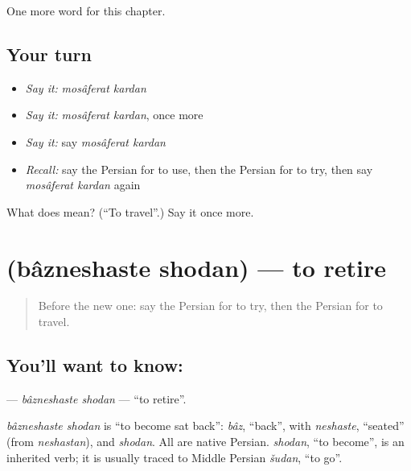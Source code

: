 \begin{grammarlens}[title={What you've built}]
One more word for this chapter.
\end{grammarlens}

\subsection*{Your turn}
\begin{itemize}
\raggedright
  \item \emph{Say it:} \emph{mosâferat kardan}
  \item \emph{Say it:} \emph{mosâferat kardan}, once more
  \item \emph{Say it:} say \emph{mosâferat kardan}
  \item \emph{Recall:} say the Persian for to use, then the Persian for to try, then say \emph{mosâferat kardan} again
\end{itemize}

\begin{tcolorbox}[breakable,colback=teal!4,colframe=teal!35!black,title={Before you move on}]
What does   mean? (\textquotedblleft{}To travel\textquotedblright{}.) Say it once more.
\end{tcolorbox}
\section[\texorpdfstring{\fa{بازنشسته} \fa{شدن} (bâzneshaste shodan)}{بازنشسته شدن (bâzneshaste shodan)}]{  (bâzneshaste shodan) — to retire}

\label{lesson:FA-C256-bazneshaste-shodan}



\begin{quote}
Before the new one: say the Persian for to try, then the Persian for to travel.
\end{quote}

\subsection*{You'll want to know:  }
\textbf{ } — \emph{bâzneshaste shodan} — \textquotedblleft{}to retire\textquotedblright{}.

\begin{cousinweb}
\emph{bâzneshaste shodan} is \textquotedblleft{}to become sat back\textquotedblright{}: \emph{bâz}, \textquotedblleft{}back\textquotedblright{}, with \emph{neshaste}, \textquotedblleft{}seated\textquotedblright{} (from \emph{neshastan}), and \emph{shodan}. All are native Persian. \emph{shodan}, \textquotedblleft{}to become\textquotedblright{}, is an inherited verb; it is usually traced to Middle Persian \emph{šudan}, \textquotedblleft{}to go\textquotedblright{}.
\end{cousinweb}

